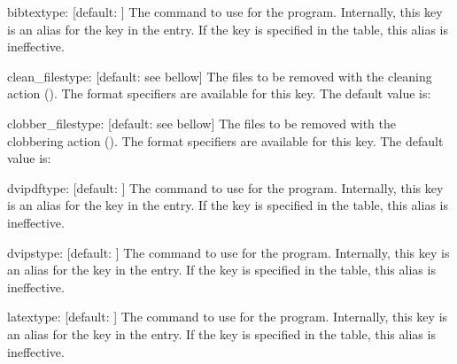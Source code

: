 \documentclass[draft]{llmk-doc}
\begin{document}
\begin{confkey}{bibtex}{type: }[default: ]
The command to use for the  program. Internally, this key is
an alias for the  key in the  entry. If the
 key is specified in the  table, this alias is
ineffective.
\end{confkey}

\begin{confkey}{clean\_files}{type: }
  [default: see bellow]
The files to be removed with the cleaning action (). The format
specifiers are available for this key. The default value is:
%
\begin{htcode}
[
  "%
  "%
]
\end{htcode}
\end{confkey}

\begin{confkey}{clobber\_files}{type: }
  [default: see bellow]
The files to be removed with the clobbering action (). The format
specifiers are available for this key. The default value is:
%
\end{confkey}

\begin{confkey}{dvipdf}{type: }[default: ]
The command to use for the  program. Internally, this key is
an alias for the  key in the  entry. If the
 key is specified in the  table, this alias is
ineffective.
\end{confkey}

\begin{confkey}{dvips}{type: }[default: ]
The command to use for the  program. Internally, this key is an
alias for the  key in the  entry. If the
 key is specified in the  table, this alias is
ineffective.
\end{confkey}

\begin{confkey}{latex}{type: }[default: ]
The command to use for the  program. Internally, this key is an
alias for the  key in the  entry. If the
 key is specified in the  table, this alias is
ineffective.
\end{confkey}
\end{document}
